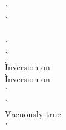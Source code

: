 \begin{description}
\begin{tabbing}
    \`  \\
    \`  \\
  \\
    \`  \\
    \`  \\
    \` Inversion on  \\
    \` Inversion on  \\
    \`  \\
    \`  \\
    \` Vacuously true \\
    \`  \\
 \end{tabbing}


\end{description}
